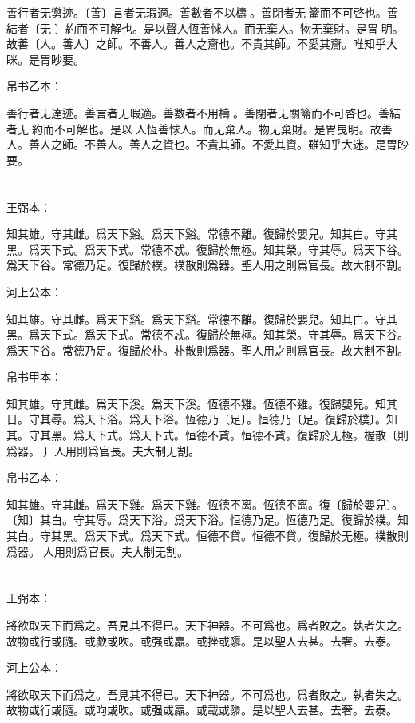 \documentclass[a5paper]{ctexbook}
\begin{document}
    善行者无勶迹。〔善〕言者无瑕適。善數者不以檮𥮥。善閉者无󱁥籥而不可啓也。善結者〔无𦄿〕約而不可解也。是以聲人恆善㤹人。而无棄人。物无棄財。是胃𢘽明。故善〔人。善人〕之師。不善人。善人之齎也。不貴其師。不愛其齎。唯知乎大眯。是胃眇要。

    帛书乙本：

    善行者无達迹。善言者无瑕適。善數者不用檮󱁦。善閉者无關籥而不可啓也。善結者无𦄿約而不可解也。是以𦔻人恆善㤹人。而无棄人。物无棄財。是胃曳明。故善人。善人之師。不善人。善人之資也。不貴其師。不愛其資。雖知乎大迷。是胃眇要。

    \chapter{}
    王弼本：

    知其雄。守其雌。爲天下谿。爲天下谿。常德不離。復歸於嬰兒。知其白。守其黑。爲天下式。爲天下式。常德不忒。復歸於無極。知其榮。守其辱。爲天下谷。爲天下谷。常德乃足。復歸於樸。樸散則爲器。聖人用之則爲官長。故大制不割。

    河上公本：

    知其雄。守其雌。爲天下谿。爲天下谿。常德不離。復歸於嬰兒。知其白。守其黑。爲天下式。爲天下式。常德不忒。復歸於無極。知其榮。守其辱。爲天下谷。爲天下谷。常德乃足。復歸於朴。朴散則爲器。聖人用之則爲官長。故大制不割。

    帛书甲本：

    知其雄。守其雌。爲天下溪。爲天下溪。恆德不雞。恆德不雞。復歸嬰兒。知其日。守其辱。爲天下浴。爲天下浴。恆德乃〔足〕。恒德乃〔足。復歸於樸〕。知其。守其黑。爲天下式。爲天下式。恒德不貣。恒德不貣。復歸於无極。楃散〔則爲器。𦔻〕人用則爲官長。夫大制无割。

    帛书乙本：

    知其雄。守其雌。爲天下雞。爲天下雞。恆德不离。恆德不离。復〔歸於嬰兒〕。〔知〕其白。守其辱。爲天下浴。爲天下浴。恒德乃足。恆德乃足。復歸於樸。知其白。守其黑。爲天下式。爲天下式。恒德不貸。恒德不貸。復歸於无極。樸散則爲器。𦔻人用則爲官長。夫大制无割。

    \chapter{}
    王弼本：

    將欲取天下而爲之。吾見其不得已。天下神器。不可爲也。爲者敗之。執者失之。故物或行或隨。或歔或吹。或强或羸。或挫或隳。是以聖人去甚。去奢。去泰。

    河上公本：

    將欲取天下而爲之。吾見其不得已。天下神器。不可爲也。爲者敗之。執者失之。故物或行或隨。或呴或吹。或强或羸。或載或隳。是以聖人去甚。去奢。去泰。
\end{document}
